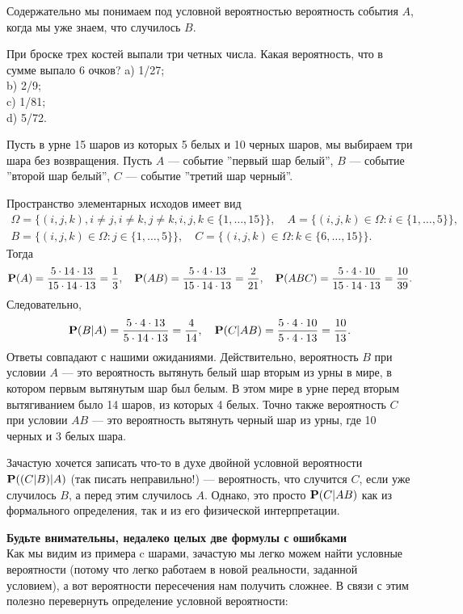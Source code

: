 \documentclass[11 pt,russian]{article}
\begin{document}
Содержательно мы понимаем под условной вероятностью вероятность события $A$, когда мы уже знаем, что случилось $B$.
\begin{Que}
При броске трех костей выпали три четных числа. Какая вероятность, что в сумме выпало 6 очков?
a) 1/27;\\
b) 2/9;\\
c) 1/81;\\
d) 5/72.
\end{Que}
\begin{Exam}
Пусть в урне 15 шаров из которых 5 белых и 10 черных шаров, мы выбираем три шара без возвращения. Пусть $A$ --- событие ''первый шар белый'', $B$ --- событие ''второй шар белый'', $C$ --- событие ''третий шар черный''. 

Пространство элементарных исходов имеет вид 
\begin{eqnarray*}
\Omega = \{(i,j,k), i\neq j, i\neq k, j\neq k, i,j,k\in \{1,\dotsc,15\}\}, \quad
A = \{(i,j,k)\in \Omega: i\in \{1,\dotsc,5\}\}, \\
B = \{(i,j,k)\in \Omega: j\in \{1,\dotsc,5\}\}, \quad
C = \{(i,j,k)\in \Omega: k\in \{6,\dotsc,15\}\}.
\end{eqnarray*}
Тогда
$$
{\bf P}(A) = \frac{5\cdot 14\cdot 13}{15\cdot 14\cdot 13} = \frac13,\quad {\bf P}(AB) = \frac{5\cdot 4\cdot 13}{15\cdot 14\cdot 13} = \frac{2}{21},\quad {\bf P}(ABC) = \frac{5\cdot 4\cdot 10}{15 \cdot 14 \cdot 13} = \frac{10}{39}.
$$
Следовательно,
$$
{\bf P}(B|A) = \frac{5\cdot 4\cdot 13}{5\cdot 14 \cdot 13} = \frac{4}{14},\quad
{\bf P}(C|AB) = \frac{5 \cdot 4 \cdot 10}{5\cdot 4\cdot 13} = \frac{10}{13}.
$$
Ответы совпадают с нашими ожиданиями. Действительно, вероятность $B$ при условии $A$ --- это вероятность вытянуть белый шар вторым из урны в мире, в котором первым вытянутым шар был белым. В этом мире в урне перед вторым вытягиванием было 14 шаров, из которых 4 белых. Точно также вероятность $C$ при условии $AB$ --- это вероятность вытянуть черный шар из урны, где 10 черных и 3 белых шара. 

Зачастую хочется записать что-то в духе двойной условной вероятности ${\bf P}((C|B)|A)$ (так писать неправильно!)  --- вероятность, что случится $C$, если уже случилось $B$, а перед этим случилось $A$. Однако, это просто ${\bf P}(C|AB)$ как из формального определения, так и из его физической интерпретации.
\end{Exam}
{\bf Будьте внимательны, недалеко целых две формулы с ошибками\\ }
Как мы видим из примера c шарами, зачастую мы легко можем найти условные вероятности (потому что легко работаем в новой реальности, заданной условием), а вот вероятности пересечения нам получить сложнее. В связи с этим полезно перевернуть определение условной вероятности:
\end{document}
